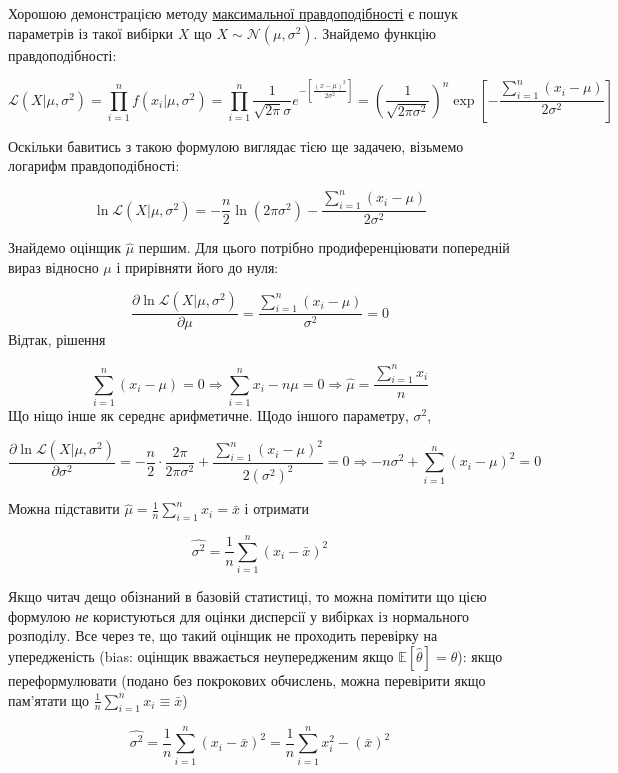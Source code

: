 \documentclass[
  11pt,
]{book}
\begin{document}
Хорошою демонстрацією методу \hyperref[mle]{максимальної
правдоподібності} є пошук параметрів із такої вибірки \(X\) що
\(X \sim \mathcal{N}(\mu, \sigma^2)\). Знайдемо функцію
правдоподібності:

\[\mathcal{L}(X | \mu, \sigma^2) = \prod \limits_{i=1}^n f(x_i| \mu, \sigma^2) = \prod \limits_{i=1}^n \frac{1}{\sqrt{2 \pi} \sigma} e^{-\left[ \frac{(x - \mu)^2}{2 \sigma^2} \right]} = \left( \frac{1}{\sqrt{2 \pi \sigma^2}} \right)^n \exp \left[ - \frac{\sum \limits_{i=1}^n (x_i - \mu)}{2 \sigma^2} \right]\]

Оскільки бавитись з такою формулою виглядає тією ще задачею, візьмемо
логарифм правдоподібності:

\[\ln \mathcal{L}(X | \mu, \sigma^2) = - \frac{n}{2} \ln{(2 \pi \sigma^2)} - \frac{\sum \limits_{i=1}^n (x_i - \mu)}{2 \sigma^2}\]

Знайдемо оцінщик \(\hat{\mu}\) першим. Для цього потрібно
продиференціювати попередній вираз відносно \(\mu\) і прирівняти його до
нуля:

\[\frac{\partial \ln \mathcal{L}(X | \mu, \sigma^2)}{\partial \mu} = \frac{\sum \limits_{i=1}^n (x_i - \mu)}{\sigma^2} = 0\]
Відтак, рішення

\[\sum \limits_{i=1}^n (x_i - \mu) = 0 \Rightarrow \sum \limits_{i=1}^n x_i - n \mu = 0 \Rightarrow \hat{\mu} = \frac{\sum \limits_{i=1}^n x_i}{n}\]
Що ніщо інше як середнє арифметичне. Щодо іншого параметру,
\(\sigma^2\),

\[\frac{\partial \ln \mathcal{L}(X | \mu, \sigma^2)}{\partial \sigma^2} = - \frac{n}{2} \cdot \frac{2 \pi}{2 \pi \sigma^2} + \frac{\sum \limits_{i=1}^n (x_i - \mu)^2}{2 (\sigma^2)^2} = 0 \Rightarrow -n \sigma^2 + \sum \limits_{i=1}^n (x_i - \mu)^2 = 0\]

Можна підставити
\(\hat{\mu} = \frac{1}{n} \sum \limits_{i=1}^n x_i = \bar{x}\) і
отримати

\[\hat{\sigma^2} = \frac{1}{n} \sum \limits_{i=1}^n (x_i - \bar{x})^2\]

Якщо читач дещо обізнаний в базовій статистиці, то можна помітити що
цією формулою \emph{не} користуються для оцінки дисперсії у вибірках із
нормального розподілу. Все через те, що такий оцінщик не проходить
перевірку на упередженість (bias: оцінщик вважається неупередженим якщо
\(\mathbb{E}[\hat{\theta}] = \theta\)): якщо переформулювати (подано без
покрокових обчислень, можна перевірити якщо пам'ятати що
\(\frac{1}{n} \sum \limits_{i=1}^n x_i \equiv \bar{x}\))

\[\hat{\sigma^2} = \frac{1}{n} \sum \limits_{i=1}^n (x_i - \bar{x})^2 = \frac{1}{n} \sum \limits_{i=1}^n x_i^2 - (\bar{x})^2\]
\end{document}
